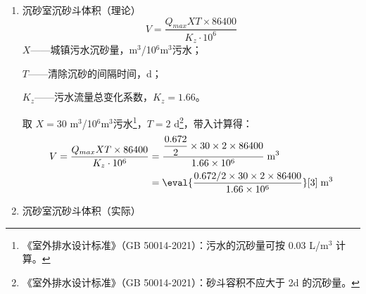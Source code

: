 \begin{enumerate}
	\item 沉砂室沉砂斗体积（理论）
	\begin{equation}
		V=\dfrac{Q_{max}XT\times86400}{K_z \cdot 10^6}
	\end{equation}
	$X$——城镇污水沉砂量，m$^3$/10$^6$m$^3$污水；\par
	$T$——清除沉砂的间隔时间，d；\par
	$K_z$——污水流量总变化系数，$K_z=1.66$。

	取 $X=30$ m$^3$/10$^6$m$^3$污水\footnote{《室外排水设计标准》（GB 50014-2021）：污水的沉砂量可按 0.03 L/m$^3$ 计算。}，$T=2$ d\footnote{《室外排水设计标准》（GB 50014-2021）：砂斗容积不应大于 2d 的沉砂量。}，带入计算得：
	\begin{align*}
		V=\dfrac{Q_{max}XT\times86400}{K_z \cdot 10^6} &=\dfrac{\dfrac{0.672}{2}\times 30\times 2\times 86400}{1.66 \times 10^6} \;\text{m$^3$} \\
		& = \eval{\dfrac{0.672/2\times 30\times 2\times 86400}{1.66 \times 10^6}}[3] \;\text{m$^3$}
	\end{align*}

	\item 沉砂室沉砂斗体积（实际）
	

\end{enumerate}
